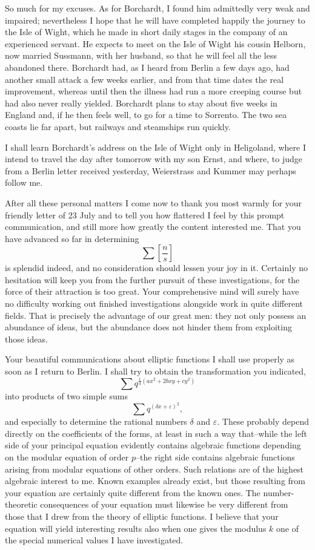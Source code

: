 \documentclass[11pt]{article}
\begin{document}
So much for my excuses. As for Borchardt, I found him admittedly very weak and impaired; nevertheless I hope that he will have completed happily the journey to the Isle of Wight, which he made in short daily stages in the company of an experienced servant. He expects to meet on the Isle of Wight his cousin Helborn, now married Sussmann, with her husband, so that he will feel all the less abandoned there. Borchardt had, as I heard from Berlin a few days ago, had another small attack a few weeks earlier, and from that time dates the real improvement, whereas until then the illness had run a more creeping course but had also never really yielded. Borchardt plans to stay about five weeks in England and, if he then feels well, to go for a time to Sorrento. The two sea coasts lie far apart, but railways and steamships run quickly.

I shall learn Borchardt's address on the Isle of Wight only in Heligoland, where I intend to travel the day after tomorrow with my son Ernst, and where, to judge from a Berlin letter received yesterday, Weierstrass and Kummer may perhaps follow me.

After all these personal matters I come now to thank you most warmly for your friendly letter of 23 July and to tell you how flattered I feel by this prompt communication, and still more how greatly the content interested me. That you have advanced so far in determining
\[
  \sum \left[\frac{n}{s}\right]
\]
is splendid indeed, and no consideration should lessen your joy in it. Certainly no hesitation will keep you from the further pursuit of these investigations, for the force of their attraction is too great. Your comprehensive mind will surely have no difficulty working out finished investigations alongside work in quite different fields. That is precisely the advantage of our great men: they not only possess an abundance of ideas, but the abundance does not hinder them from exploiting those ideas.

Your beautiful communications about elliptic functions I shall use properly as soon as I return to Berlin. I shall try to obtain the transformation you indicated,
\[
  \sum q^{\frac14(ax^2+2bxy+cy^2)}
\]
into products of two simple sums
\[
  \sum q^{(\delta x+\varepsilon)^2},
\]
and especially to determine the rational numbers $\delta$ and $\varepsilon$. These probably depend directly on the coefficients of the forms, at least in such a way that--while the left side of your principal equation evidently contains algebraic functions depending on the modular equation of order $p$--the right side contains algebraic functions arising from modular equations of other orders. Such relations are of the highest algebraic interest to me. Known examples already exist, but those resulting from your equation are certainly quite different from the known ones. The number-theoretic consequences of your equation must likewise be very different from those that I drew from the theory of elliptic functions. I believe that your equation will yield interesting results also when one gives the modulus $k$ one of the special numerical values I have investigated.
\end{document}
